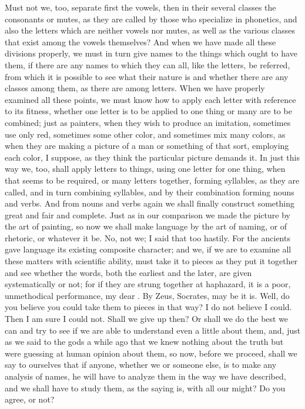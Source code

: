 {{{{{Must not we, too, separate first the vowels, then in their several classes the consonants or mutes, as they are called by those who specialize in phonetics, and also the letters which are neither vowels nor mutes, as well as the various classes that exist among the vowels themselves?  And when we have made all these divisions properly, we must in turn give names to the things which ought to have them, if there are any names to which they can all, like the letters, be referred, from which it is possible to see what their nature is and whether there are any classes among them, as there are among letters. When we have properly examined all these points, we must know how to apply each letter with reference to its fitness, whether one letter is to be applied to one thing or many are to be combined; just as painters, when they wish to produce an imitation, sometimes use only red,  sometimes some other color, and sometimes mix many colors, as when they are making a picture of a man or something of that sort, employing each color, I suppose, as they think the particular picture demands it. In just this way we, too, shall apply letters to things, using one letter for one thing, when that seems to be required, or many letters together, forming syllables, as they are called, and in turn combining syllables,  and by their combination forming nouns and verbs. And from nouns and verbs again we shall finally construct something great and fair and complete. Just as in our comparison we made the picture by the art of painting, so now we shall make language by the art of naming, or of rhetoric, or whatever it be. No, not we; I said that too hastily. For the ancients gave language its existing composite character; and we, if we are to examine all these matters with scientific ability,  must take it to pieces as they put it together and see whether the words, both the earliest and the later, are given systematically or not; for if they are strung together at haphazard, it is a poor, unmethodical performance, my dear \hermogenesspeaks.
\hermogenesspeaks
By Zeus, Socrates, may be it is.
\socratesspeaks
Well, do you believe you could take them to pieces in that way? I do not believe I could.
\hermogenesspeaks
Then I am sure I could not.
\socratesspeaks
Shall we give up then? Or shall we do the best we can and try to see if we are able to understand even a little about them,  and, just as we said to the gods a while ago that we knew nothing about the truth but were guessing at human opinion about them, so now, before we proceed, shall we say to ourselves that if anyone, whether we or someone else, is to make any analysis of names, he will have to analyze them in the way we have described, and we shall have to study them, as the saying is, with all our might? Do you agree, or not?
}}}}}
